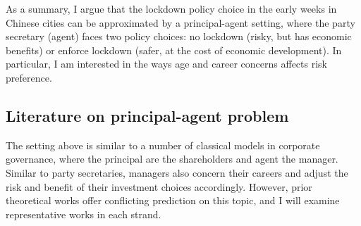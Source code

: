 \documentclass{article}
\begin{document}
\begin{CJK}{UTF8}{gbsn}
As a summary, I argue that the lockdown policy choice in the early weeks in Chinese cities can be approximated by a principal-agent setting, where the party secretary (agent) faces two policy choices: no lockdown (risky, but has economic benefits) or enforce lockdown (safer, at the cost of economic development). In particular, I am interested in the ways age and career concerns affects risk preference.

%

%

\subsection{Literature on principal-agent problem} 

The setting above is similar to a number of classical models in corporate governance, where the principal are the shareholders and agent the manager. Similar to party secretaries, managers also concern their careers and adjust the risk and benefit of their investment choices accordingly. However, prior theoretical works offer conflicting prediction on this topic, and I will examine representative works in each strand.





\end{CJK}
\end{document}
